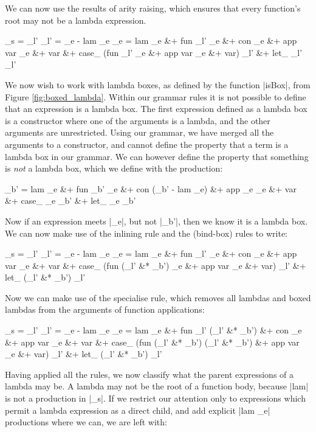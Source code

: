 \documentclass[preprint]{sigplanconf}
\begin{document}
We can now use the results of arity raising, which ensures that every function's root may not be a lambda expression.

\begin{code}
_s   = _l'
_l' = _e - lam _e
_e =  lam _e &+ fun _l' _e &+ con _e &+ app var _e &+ var &+
      case_ (fun _l' _e &+ app var _e &+ var) _l' &+ let_ _l' _l'
\end{code}

We now wish to work with lambda boxes, as defined by the function |isBox|, from Figure \ref{fig:boxed_lambda}. Within our grammar rules it is not possible to define that an expression is a lambda box. The first expression defined as a lambda box is a constructor where one of the arguments is a lambda, and the other arguments are unrestricted. Using our grammar, we have merged all the arguments to a constructor, and cannot define the property that a term is a lambda box in our grammar. We can however define the property that something is \textit{not} a lambda box, which we define with the production:

%
\begin{code}
_b'  =  lam _e &+ fun _b' _e &+ con (_b' - lam _e) &+ app _e _e &+ var &+
        case_ _e _b' &+ let_ _e _b'
\end{code}

Now if an expression meets |_e|, but not |_b'|, then we know it is a lambda box. We can now make use of the inlining rule and the (bind-box) rules to write:

\begin{code}
_s   = _l'
_l' = _e - lam _e
_e =  lam _e &+ fun _l' _e &+ con _e &+ app var _e &+ var &+
      case_ (fun (_l' &* _b') _e &+ app var _e &+ var) _l' &+ let_ (_l' &* _b') _l'
\end{code}

Now we can make use of the specialise rule, which removes all lambdas and boxed lambdas from the arguments of function applications:

\begin{code}
_s   = _l'
_l' = _e - lam _e
_e =  lam _e &+ fun _l' (_l' &* _b') &+ con _e &+ app var _e &+ var &+
      case_ (fun (_l' &* _b') (_l' &* _b') &+ app var _e &+ var) _l' &+
      let_ (_l' &* _b') _l'
\end{code}

Having applied all the rules, we now classify what the parent expressions of a lambda may be. A lambda may not be the root of a function body, because |lam| is not a production in |_s|. If we restrict our attention only to expressions which permit a lambda expression as a direct child, and add explicit |lam _e| productions where we can, we are left with:
\end{document}
